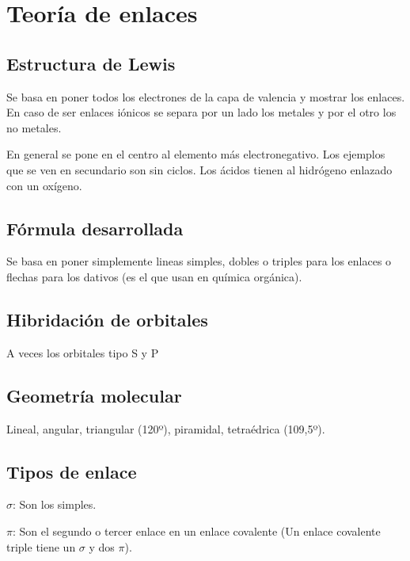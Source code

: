 \section{Teoría de enlaces}

\subsection*{Estructura de Lewis}

Se basa en poner todos los electrones de la capa de valencia y mostrar los enlaces. En caso de ser enlaces iónicos se separa por un lado los metales y por el otro los no metales.

En general se pone en el centro al elemento más electronegativo. Los ejemplos que se ven en secundario son sin ciclos. Los ácidos tienen al hidrógeno enlazado con un oxígeno. 

\subsection*{Fórmula desarrollada}

Se basa en poner simplemente lineas simples, dobles o triples para los enlaces o flechas para los dativos (es el que usan en química orgánica).

\subsection*{Hibridación de orbitales}

A veces los orbitales tipo S y P

\subsection*{Geometría molecular}

Lineal, angular, triangular (120º), piramidal, tetraédrica (109,5º).



\subsection*{Tipos de enlace}

$\sigma$: Son los simples.

$\pi$: Son el segundo o tercer enlace en un enlace covalente (Un enlace covalente triple tiene un $\sigma$ y dos $\pi$).